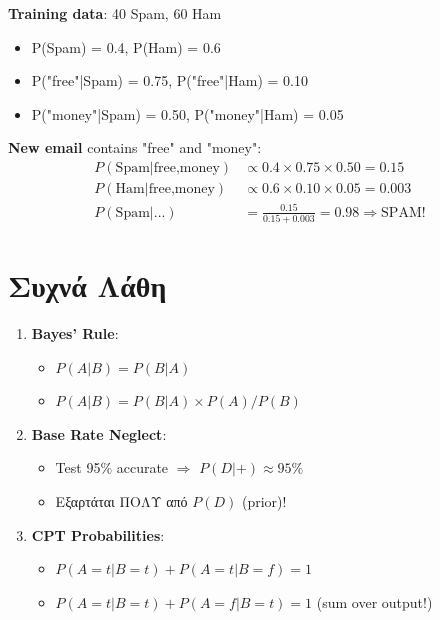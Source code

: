 \begin{examplebox}
\textbf{Training data}: 40 Spam, 60 Ham
\begin{itemize}
    \item P(Spam) = 0.4, P(Ham) = 0.6
    \item P("free"|Spam) = 0.75, P("free"|Ham) = 0.10
    \item P("money"|Spam) = 0.50, P("money"|Ham) = 0.05
\end{itemize}

\textbf{New email} contains "free" and "money":
\begin{align*}
P(\text{Spam}|\text{free,money}) &\propto 0.4 \times 0.75 \times 0.50 = 0.15 \\
P(\text{Ham}|\text{free,money}) &\propto 0.6 \times 0.10 \times 0.05 = 0.003 \\[0.5em]
P(\text{Spam}|\ldots) &= \frac{0.15}{0.15 + 0.003} = 0.98 \Rightarrow \boxed{\text{SPAM!}}
\end{align*}
\end{examplebox}

\section{Συχνά Λάθη}

\begin{warningbox}
\begin{enumerate}
    \item \textbf{Bayes' Rule}:
    \begin{itemize}
        \item[$\times$] $P(A|B) = P(B|A)$
        \item[\checkmark] $P(A|B) = P(B|A) \times P(A) / P(B)$
    \end{itemize}

    \item \textbf{Base Rate Neglect}:
    \begin{itemize}
        \item[$\times$] Test 95\% accurate $\Rightarrow$ $P(D|+) \approx 95\%$
        \item[\checkmark] Εξαρτάται ΠΟΛΥ από $P(D)$ (prior)!
    \end{itemize}

    \item \textbf{CPT Probabilities}:
    \begin{itemize}
        \item[$\times$] $P(A=t|B=t) + P(A=t|B=f) = 1$
        \item[\checkmark] $P(A=t|B=t) + P(A=f|B=t) = 1$ (sum over output!)
    \end{itemize}
\end{enumerate}
\end{warningbox}


